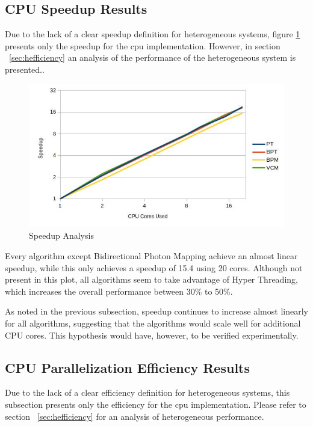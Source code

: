 \subsection{CPU Speedup Results}

Due to the lack of a clear speedup definition for heterogeneous systems, figure \ref{img:speedup} presents only the speedup for the \gls{cpu} implementation. However, in section ~\ref{sec:hefficiency} an analysis of the performance of the heterogeneous system is presented..

\begin{figure}[H]
\centering
\includegraphics[width=0.8\linewidth]{img/speedup.jpg}
\caption{\label{img:speedup} Speedup Analysis}
\end{figure}

Every algorithm except Bidirectional Photon Mapping achieve an almost linear speedup, while this only achieves a speedup of 15.4 using 20 cores. Although not present in this plot, all algorithms seem to take advantage of Hyper Threading, which increases the overall performance between 30\% to 50\%.

As noted in the previous subsection, speedup continues to increase almost linearly for all algorithms, suggesting that the algorithms would scale well for additional CPU cores. This hypothesis would have, however, to be verified experimentally.

\subsection{CPU Parallelization Efficiency Results}

Due to the lack of a clear efficiency definition for heterogeneous systems, this subsection presents only the efficiency for the \gls{cpu} implementation. Please refer to section ~\ref{sec:hefficiency} for an analysis of heterogeneous performance.

